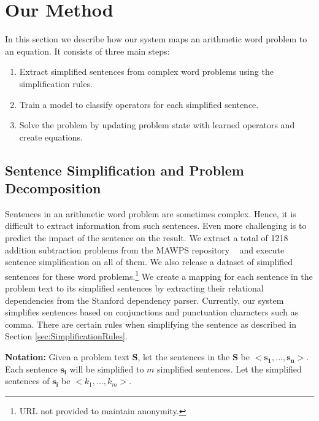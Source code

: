 \documentclass[11pt]{article}
\begin{document}
\section{Our Method}
In this section we describe how our system maps an arithmetic word problem to an equation. It consists of three main steps:
\begin{enumerate}[topsep=0pt,itemsep=-1ex,partopsep=1ex,parsep=1ex]
\item Extract simplified sentences from complex word problems using the simplification rules. 
\item Train a model to classify operators for each simplified sentence.
\item Solve the problem by updating problem state with learned operators and create equations.
\end{enumerate}

\subsection{Sentence Simplification and Problem Decomposition}
Sentences in an arithmetic word problem are sometimes complex. Hence, it is difficult to extract information from such sentences. Even more challenging is to predict the impact of the sentence on the result. We extract a total of 1218 addition subtraction problems from the MAWPS repository ~\cite{MAWPS} and execute sentence simplification on all of them. We also release a dataset of simplified sentences for these word problems.\footnote{URL not provided to maintain anonymity.} We create a mapping for each sentence in the problem text to its simplified sentences by extracting their relational dependencies from the Stanford dependency parser. Currently, our system simplifies sentences based on conjunctions and punctuation characters such as comma. There are certain rules when simplifying the sentence as described in Section \ref{sec:SimplificationRules}.

\textbf{Notation:} Given a problem text $\mathbf{S}$, let the sentences in the $\mathbf{S}$ be $\mathbf{<s_{1},..., s_{n}>}$. Each sentence $\mathbf{s_{i}}$ will be simplified to \begin{math}m\end{math} simplified sentences. Let the simplified sentences of $\mathbf{s_{i}}$ be $\mathit{<k_{1},..., k_{m}>}$.
\end{document}
